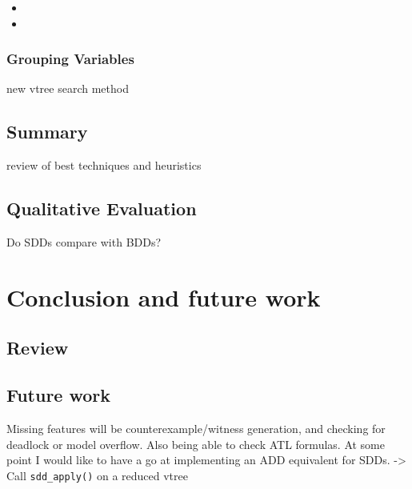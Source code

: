 \documentclass[11pt]{article}
\begin{document}
\begin{itemize}
\item 
\item 
\end{itemize}

\subsubsection{Grouping Variables}
new vtree search method 
\subsection{Summary}

review of best techniques and heuristics

\subsection{Qualitative Evaluation}

Do SDDs compare with BDDs?

\section{Conclusion and future work}

\subsection{Review}

\subsection{Future work}

Missing features will be counterexample/witness generation, and checking for deadlock or model overflow. Also being able to check ATL formulas.
At some point I would like to have a go at implementing an ADD equivalent for SDDs.
-> Call \texttt{sdd\_apply()} on a reduced vtree
\end{document}

